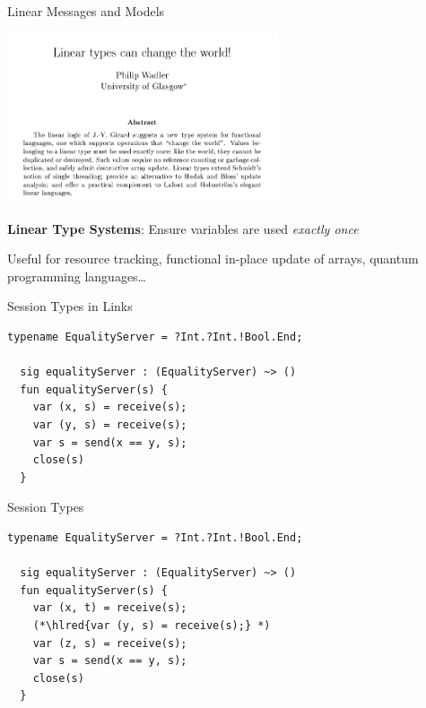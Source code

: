 \documentclass[11.5pt, aspectratio=169]{beamer}
\begin{document}

\begin{frame}{Linear Messages and Models}

  \begin{center}
    \includegraphics[width=0.6\textwidth]{images/linear-types.png}
  \end{center}

  \begin{fullpageitemize}
  \item \textbf{Linear Type Systems}: Ensure variables are used \emph{exactly once}
  \begin{itemize}
    \itemR Useful for resource tracking, functional in-place update of arrays, quantum programming languages\ldots
  \end{itemize}
  \end{fullpageitemize}

\end{frame}

\begin{frame}[fragile]{Session Types in Links}

\begin{lstlisting}[language=links]
  typename EqualityServer = ?Int.?Int.!Bool.End;

  sig equalityServer : (EqualityServer) ~> ()
  fun equalityServer(s) {
    var (x, s) = receive(s);
    var (y, s) = receive(s);
    var s = send(x == y, s);
    close(s)
  }
\end{lstlisting}
\end{frame}

\begin{frame}[fragile]{Session Types}
\begin{lstlisting}[language=links]
  typename EqualityServer = ?Int.?Int.!Bool.End;

  sig equalityServer : (EqualityServer) ~> ()
  fun equalityServer(s) {
    var (x, t) = receive(s);
    (*\hlred{var (y, s) = receive(s);} *)
    var (z, s) = receive(s);
    var s = send(x == y, s);
    close(s)
  }
\end{lstlisting}
\end{frame}
\end{document}
